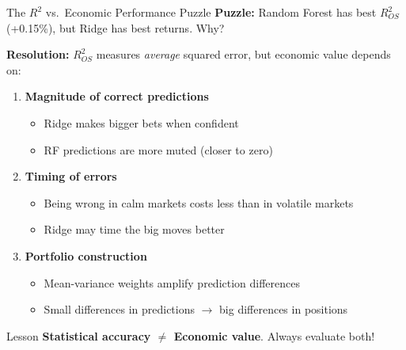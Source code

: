 \documentclass[10pt]{beamer}
\newcommand{\highlight}[1]{\textcolor{AccentOrange}{\textbf{#1}}}
\begin{document}
\begin{frame}{The $R^2$ vs.\ Economic Performance Puzzle}
  \textbf{Puzzle:} Random Forest has best $R^2_{OS}$ (+0.15\%), but Ridge has best returns. Why?

  \vspace{0.5em}
  \textbf{Resolution:} $R^2_{OS}$ measures \textit{average} squared error, but economic value depends on:

  \vspace{0.3em}
  \begin{enumerate}
    \item \textbf{Magnitude of correct predictions}
    \begin{itemize}
      \item Ridge makes bigger bets when confident
      \item RF predictions are more muted (closer to zero)
    \end{itemize}

    \vspace{0.2em}
    \item \textbf{Timing of errors}
    \begin{itemize}
      \item Being wrong in calm markets costs less than in volatile markets
      \item Ridge may time the big moves better
    \end{itemize}

    \vspace{0.2em}
    \item \textbf{Portfolio construction}
    \begin{itemize}
      \item Mean-variance weights amplify prediction differences
      \item Small differences in predictions $\to$ big differences in positions
    \end{itemize}
  \end{enumerate}

  \vspace{0.5em}
  \begin{block}{Lesson}
    \highlight{Statistical accuracy $\neq$ Economic value}. Always evaluate both!
  \end{block}
\end{frame}

\end{document}
